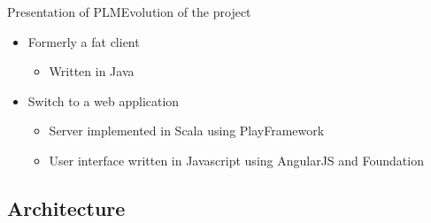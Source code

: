 \documentclass{beamer}
\begin{document}
\begin{frame}{Presentation of PLM}{Evolution of the project}
  \begin{itemize}
    \item {
      Formerly a fat client
      \begin{itemize} 
        \item { Written in Java }
      \end{itemize}
      \pause
    }
    \item {
      Switch to a web application
      \begin{itemize}
        \item { Server implemented in Scala using PlayFramework }
        \item { User interface written in Javascript using AngularJS and Foundation }
      \end{itemize}
    }
  \end{itemize}
\end{frame}

\subsection{Architecture}
\end{document}
